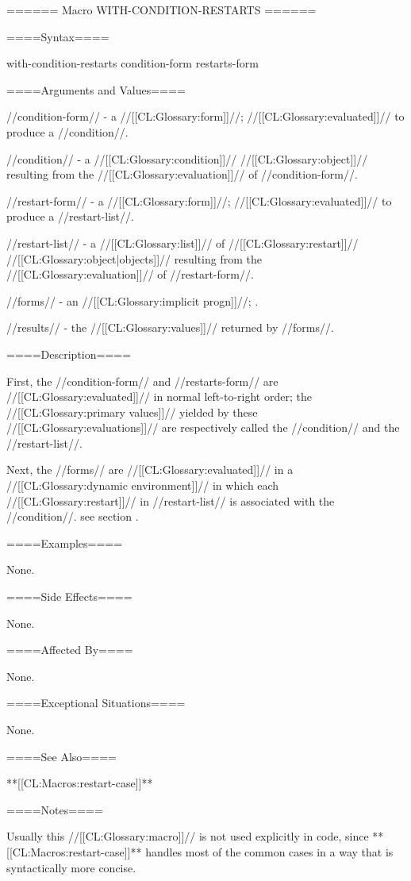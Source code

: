 ====== Macro WITH-CONDITION-RESTARTS ======

====Syntax====

\DefmacWithValuesNewline with-condition-restarts {condition-form restarts-form } {}

====Arguments and Values====

//condition-form// - a //[[CL:Glossary:form]]//; //[[CL:Glossary:evaluated]]// to produce a //condition//.

//condition// - a //[[CL:Glossary:condition]]// //[[CL:Glossary:object]]// resulting from the //[[CL:Glossary:evaluation]]// of //condition-form//.

//restart-form// - a //[[CL:Glossary:form]]//; //[[CL:Glossary:evaluated]]// to produce a //restart-list//.

//restart-list// - a //[[CL:Glossary:list]]// of //[[CL:Glossary:restart]]// //[[CL:Glossary:object|objects]]// resulting from the //[[CL:Glossary:evaluation]]// of //restart-form//.

//forms// - an //[[CL:Glossary:implicit progn]]//; \eval.

//results// - the //[[CL:Glossary:values]]// returned by //forms//.

====Description====

First, the //condition-form// and //restarts-form// are //[[CL:Glossary:evaluated]]// in normal left-to-right order; the //[[CL:Glossary:primary values]]// yielded by these //[[CL:Glossary:evaluations]]// are respectively called the //condition// and the //restart-list//.

Next, the //forms// are //[[CL:Glossary:evaluated]]// in a //[[CL:Glossary:dynamic environment]]// in which each //[[CL:Glossary:restart]]// in //restart-list// is associated with the //condition//. see section {\secref\AssocRestartWithCond}.

====Examples====

None.

====Side Effects====

None.

====Affected By====

None.

====Exceptional Situations====

None.

====See Also====

**[[CL:Macros:restart-case]]**

====Notes====

Usually this //[[CL:Glossary:macro]]// is not used explicitly in code, since **[[CL:Macros:restart-case]]** handles most of the common cases in a way that is syntactically more concise.

